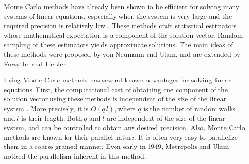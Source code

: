 \documentclass[a4paper,11pt]{article}
\theoremstyle{remark}
\theoremstyle{definition}
\begin{document}
    Monte Carlo methods have already been shown to be efficient for
    solving many systems of linear equations, especially when the system is
    very large and the required precision is relatively low
    \cite{Tan2002,Dimov1998,Alexandrov1998}.  These methods craft
    statistical estimators whose mathematical expectation is a component
    of the solution vector.  Random sampling of these estimators yields
    approximate solutions\cite{Tan2002, Rubinstein1981,Westlake1968}.
    The main ideas of these methods were proposed by von Neumann and
    Ulam, and are extended by Forsythe and Liebler \cite{Forsythe1950}.
    
    Using Monte Carlo methods has several known advantages for solving
    linear equations.  First, the computational cost of obtaining one
    component of the solution vector using these methods is independent
    of the size of the linear system \cite{Tan2002}.  More precisely, it
    is $O(q\,l)$, where $q$ is the number of random walks and $l$ is
    their length.  Both $q$ and $l$ are independent of the size of the
    linear system, and can be controlled to obtain any desired
    precision.  Also, Monte Carlo methods are known for their
    parallel nature.  It is often very easy to parallelize them in a
    coarse grained manner.  Even early in 1949, Metropolis and Ulam
    \cite{Metropolisand1949} noticed the parallelism inherent in this
    method.
    
\end{document}
